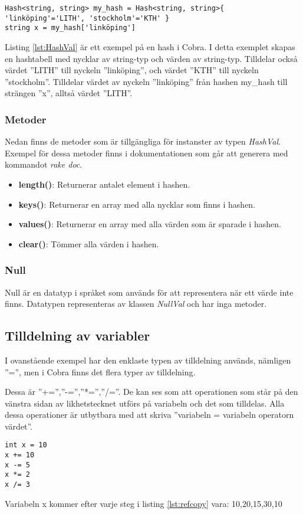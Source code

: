 \documentclass{TDP003mall}
\begin{document}
\begin{lstlisting}[caption=Hash-exempel, label=lst:HashVal]
Hash<string, string> my_hash = Hash<string, string>{ 'linköping'='LITH', 'stockholm'='KTH' }
string x = my_hash['linköping']
\end{lstlisting}
Listing \ref{lst:HashVal} är ett exempel på en hash i Cobra.
I detta exemplet skapas en hashtabell med nycklar av string-typ och värden av string-typ. Tilldelar också värdet ''LITH'' till nyckeln ''linköping'', och värdet ''KTH'' till nyckeln ''stockholm''.
Tilldelar värdet av nyckeln ''linköping'' från hashen my\_hash till strängen ''x'', alltså värdet ''LITH''.

\subsubsection*{Metoder}
Nedan finns de metoder som är tillgängliga för instanster av typen \emph{HashVal}.
Exempel för dessa metoder finns i dokumentationen som går att generera med kommandot \emph{rake doc}.

\begin{itemize}
    \item \textbf{length()}: Returnerar antalet element i hashen.
    \item \textbf{keys()}: Returnerar en array med alla nycklar som finns i hashen.
    \item \textbf{values()}: Returnerar en array med alla värden som är sparade i hashen.
    \item \textbf{clear()}: Tömmer alla värden i hashen.
\end{itemize}

\subsubsection{Null}
Null är en datatyp i språket som används för att representera när ett värde inte finns.
Datatypen representeras av klassen \emph{NullVal} och har inga metoder.

\subsection{Tilldelning av variabler}
I ovanstående exempel har den enklaste typen av tilldelning används, nämligen ''='', men i Cobra finns det flera typer av tilldelning.

Dessa är ''+='',''-='',''*='',''/=''. De kan ses som att operationen som står på den vänstra sidan av likhetstecknet utförs på variabeln och det som tilldelas.
Alla dessa operationer är utbytbara med att skriva ''variabeln = variabeln operatorn värdet''.
\begin{lstlisting}[caption=Tilldelningsexempel, label=lst:refcopy]
int x = 10
x += 10
x -= 5
x *= 2
x /= 3
\end{lstlisting}
Variabeln x kommer efter varje steg i listing \ref{lst:refcopy} vara:
10,20,15,30,10
\end{document}
